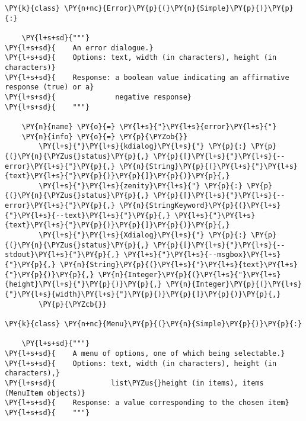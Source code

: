 \begin{Verbatim}[commandchars=\\\{\}]
\PY{k}{class} \PY{n+nc}{Error}\PY{p}{(}\PY{n}{Simple}\PY{p}{)}\PY{p}{:}

    \PY{l+s+sd}{"""}
\PY{l+s+sd}{    An error dialogue.}
\PY{l+s+sd}{    Options: text, width (in characters), height (in characters)}
\PY{l+s+sd}{    Response: a boolean value indicating an affirmative response (true) or a}
\PY{l+s+sd}{              negative response}
\PY{l+s+sd}{    """}

    \PY{n}{name} \PY{o}{=} \PY{l+s}{"}\PY{l+s}{error}\PY{l+s}{"}
    \PY{n}{info} \PY{o}{=} \PY{p}{\PYZob{}}
        \PY{l+s}{"}\PY{l+s}{kdialog}\PY{l+s}{"} \PY{p}{:} \PY{p}{(}\PY{n}{\PYZus{}status}\PY{p}{,} \PY{p}{[}\PY{l+s}{"}\PY{l+s}{--error}\PY{l+s}{"}\PY{p}{,} \PY{n}{String}\PY{p}{(}\PY{l+s}{"}\PY{l+s}{text}\PY{l+s}{"}\PY{p}{)}\PY{p}{]}\PY{p}{)}\PY{p}{,}
        \PY{l+s}{"}\PY{l+s}{zenity}\PY{l+s}{"} \PY{p}{:} \PY{p}{(}\PY{n}{\PYZus{}status}\PY{p}{,} \PY{p}{[}\PY{l+s}{"}\PY{l+s}{--error}\PY{l+s}{"}\PY{p}{,} \PY{n}{StringKeyword}\PY{p}{(}\PY{l+s}{"}\PY{l+s}{--text}\PY{l+s}{"}\PY{p}{,} \PY{l+s}{"}\PY{l+s}{text}\PY{l+s}{"}\PY{p}{)}\PY{p}{]}\PY{p}{)}\PY{p}{,}
        \PY{l+s}{"}\PY{l+s}{Xdialog}\PY{l+s}{"} \PY{p}{:} \PY{p}{(}\PY{n}{\PYZus{}status}\PY{p}{,} \PY{p}{[}\PY{l+s}{"}\PY{l+s}{--stdout}\PY{l+s}{"}\PY{p}{,} \PY{l+s}{"}\PY{l+s}{--msgbox}\PY{l+s}{"}\PY{p}{,} \PY{n}{String}\PY{p}{(}\PY{l+s}{"}\PY{l+s}{text}\PY{l+s}{"}\PY{p}{)}\PY{p}{,} \PY{n}{Integer}\PY{p}{(}\PY{l+s}{"}\PY{l+s}{height}\PY{l+s}{"}\PY{p}{)}\PY{p}{,} \PY{n}{Integer}\PY{p}{(}\PY{l+s}{"}\PY{l+s}{width}\PY{l+s}{"}\PY{p}{)}\PY{p}{]}\PY{p}{)}\PY{p}{,}
        \PY{p}{\PYZcb{}}

\PY{k}{class} \PY{n+nc}{Menu}\PY{p}{(}\PY{n}{Simple}\PY{p}{)}\PY{p}{:}

    \PY{l+s+sd}{"""}
\PY{l+s+sd}{    A menu of options, one of which being selectable.}
\PY{l+s+sd}{    Options: text, width (in characters), height (in characters),}
\PY{l+s+sd}{             list\PYZus{}height (in items), items (MenuItem objects)}
\PY{l+s+sd}{    Response: a value corresponding to the chosen item}
\PY{l+s+sd}{    """}


\end{Verbatim}
